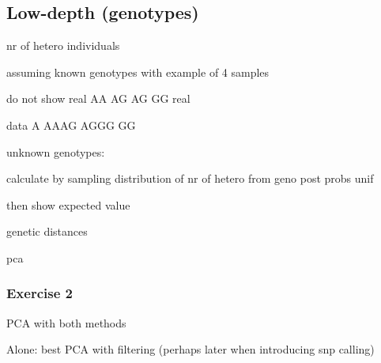 
\subsection{Low-depth (genotypes)}

\begin{frame}

nr of hetero individuals

assuming known genotypes with example of 4 samples

do not show real AA AG AG GG real

data A AAAG AGGG GG

unknown genotypes:

calculate by sampling distribution of nr of hetero from geno post probs unif

then show expected value

\end{frame}


\begin{frame}

	genetic distances

\end{frame}


\begin{frame}

	pca

\end{frame}


\begin{frame}
\frametitle{Exercise 2}

	PCA with both methods

	Alone: best PCA with filtering (perhaps later when introducing snp calling)

\end{frame}







